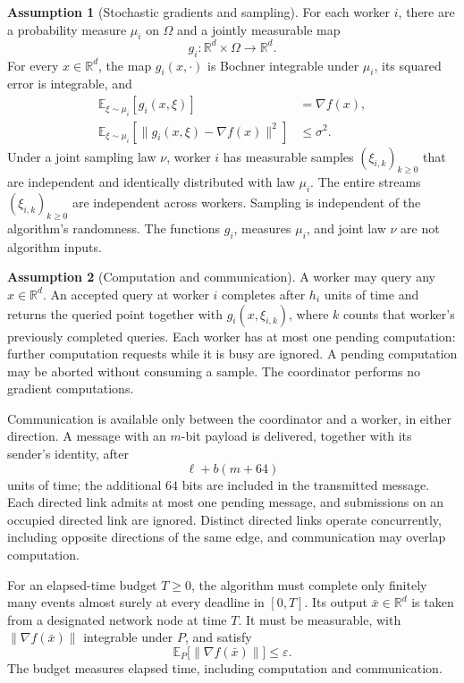 \documentclass[10pt]{article}
\theoremstyle{definition}
\newtheorem{assumption}{Assumption}
\begin{document}
\begin{assumption}[Stochastic gradients and sampling]
For each worker $i$, there are a probability measure $\mu_i$ on $\Omega$ and a jointly measurable map
\[
g_i:\mathbb{R}^d\times\Omega\to\mathbb{R}^d.
\]
For every $x\in\mathbb{R}^d$, the map $g_i(x,\cdot)$ is Bochner integrable under $\mu_i$, its squared error is integrable, and
\[
\begin{aligned}
\mathbb{E}_{\xi\sim\mu_i}[g_i(x,\xi)]&=\nabla f(x),\\
\mathbb{E}_{\xi\sim\mu_i}
 [\|g_i(x,\xi)-\nabla f(x)\|^2]&\leq\sigma^2.
\end{aligned}
\]
Under a joint sampling law $\nu$, worker $i$ has measurable samples $(\xi_{i,k})_{k\geq0}$ that are independent and identically distributed with law $\mu_i$. The entire streams $(\xi_{i,k})_{k\geq0}$ are independent across workers. Sampling is independent of the algorithm's randomness. The functions $g_i$, measures $\mu_i$, and joint law $\nu$ are not algorithm inputs.
\end{assumption}

\begin{assumption}[Computation and communication]
A worker may query any $x\in\mathbb{R}^d$. An accepted query at worker $i$ completes after $h_i$ units of time and returns the queried point together with $g_i(x,\xi_{i,k})$, where $k$ counts that worker's previously completed queries. Each worker has at most one pending computation: further computation requests while it is busy are ignored. A pending computation may be aborted without consuming a sample. The coordinator performs no gradient computations.

Communication is available only between the coordinator and a worker, in either direction. A message with an $m$-bit payload is delivered, together with its sender's identity, after
\[
\ell+b(m+64)
\]
units of time; the additional $64$ bits are included in the transmitted message. Each directed link admits at most one pending message, and submissions on an occupied directed link are ignored. Distinct directed links operate concurrently, including opposite directions of the same edge, and communication may overlap computation.
\end{assumption}

For an elapsed-time budget $T\geq0$, the algorithm must complete only finitely many events almost surely at every deadline in $[0,T]$. Its output $\bar{x}\in\mathbb{R}^d$ is taken from a designated network node at time $T$. It must be measurable, with $\|\nabla f(\bar{x})\|$ integrable under $P$, and satisfy
\[
\mathbb{E}_{P}\bigl[\|\nabla f(\bar{x})\|\bigr]\leq\varepsilon.
\]
The budget measures elapsed time, including computation and communication.
\end{document}
